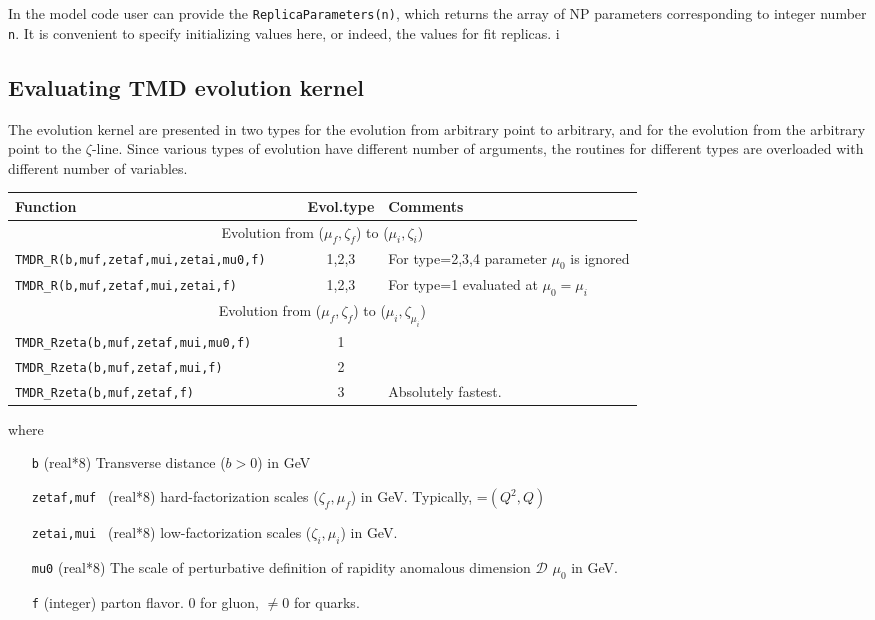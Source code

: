 \documentclass[prd,nofootinbib,eqsecnum,final]{revtex4}
\renewcommand{\(}{\left(}
\renewcommand{\)}{\right)}
\renewcommand{\[}{\left[}
\renewcommand{\]}{\right]}
\begin{document}
In the model code user can provide the \texttt{ReplicaParameters(n)}, which returns the array of NP parameters corresponding to integer number \texttt{n}. It is convenient to specify initializing values here, or indeed, the values for fit replicas. i


\subsection{Evaluating TMD evolution kernel}
\label{TMDR:R}

The evolution kernel are presented in two types for the evolution from arbitrary point to arbitrary, and for the evolution from the arbitrary point to the $\zeta$-line. Since various types of evolution have different number of arguments, the routines for different types are overloaded with different number of variables.

\begin{center}

\begin{tabular}{|l||c|l|}
Function & Evol.type & Comments
\\\hline\hline
\multicolumn{3}{|c|}{Evolution from ($\mu_f,\zeta_f$) to ($\mu_i,\zeta_i$)}
\\\hline
\texttt{TMDR{\_}R(b,muf,zetaf,mui,zetai,mu0,f)}~~~~ & 1,2,3& For type=2,3,4 parameter $\mu_0$ is ignored
\\\hline
\texttt{TMDR{\_}R(b,muf,zetaf,mui,zetai,f)}~~~~ & 1,2,3& For type=1 evaluated at $\mu_0=\mu_i$
\\\hline\hline
\multicolumn{3}{|c|}{Evolution from ($\mu_f,\zeta_f$) to ($\mu_i,\zeta_{\mu_i}$)}
\\\hline
\texttt{TMDR{\_}Rzeta(b,muf,zetaf,mui,mu0,f)}~~~~ &  1& 
\\\hline
\texttt{TMDR{\_}Rzeta(b,muf,zetaf,mui,f)}~~~~ &  2& 
\\\hline
\texttt{TMDR{\_}Rzeta(b,muf,zetaf,f)}~~~~ & 3& Absolutely fastest.
\end{tabular}
\end{center}

where 
\begin{itemize}
\item [\texttt{b}] (real*8) Transverse distance ($b>0$) in GeV
\item [\texttt{zetaf,muf }] (real*8) hard-factorization scales ($\zeta_f,\mu_f$) in GeV. Typically, =$(Q^2,Q)$
\item [\texttt{zetai,mui }] (real*8) low-factorization scales ($\zeta_i,\mu_i$) in GeV.
\item [\texttt{mu0}] (real*8) The scale of perturbative definition of rapidity anomalous dimension $\mathcal{D}$ $\mu_0$ in GeV. 
\item [\texttt{f}] (integer) parton flavor. $0$ for gluon, $\neq 0$ for quarks.
\end{itemize}
\end{document}
